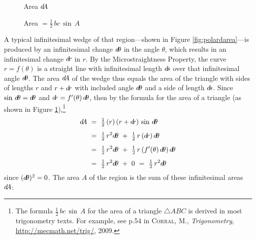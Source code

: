 \begin{figure}[h]
\begin{minipage}[b]{5cm}
\begin{center}
\begin{tikzpicture}[>=latex,every node/.style={font=\small}]
\end{tikzpicture}\vspace{-4mm}
\end{center}
\caption[]{\enskip Area $\dA$}
\label{fig:polardarea}
\end{minipage}
\begin{minipage}[b]{5cm}
\begin{center}
\vspace{-4mm}
\end{center}
\caption[]{\enskip Area $= \tfrac{1}{2}\,bc\,\sin\,A$}
\label{fig:areatriangle}
\end{minipage}
\end{figure}

A typical infinitesimal wedge of that region---shown in Figure
\ref{fig:polardarea}---is produced by an infinitesimal change $\dtheta$ in the
angle $\theta$, which results in an infinitesimal change $\dr$ in $r$. By the
Microstraightness Property, the curve $r=f(\theta)$ is a straight line with
infinitesimal length $\ds$ over that infinitesimal angle $\dtheta$.
The area $\dA$ of the wedge thus equals the area of the triangle with sides
of lengths $r$ and $r+\dr$ with included angle $\dtheta$ and a side of length
$\ds$. Since $\sin\,\dtheta = \dtheta$ and $\dr=f'(\theta)\,\dtheta$, then by
the formula for the area of a triangle (as shown in Figure
\ref{fig:areatriangle}),\footnote{The formula $\tfrac{1}{2}\,bc\,\sin\,A$ for
the area of a triangle $\triangle ABC$ is derived in most trigonometry texts.
For example, see p.54 in \textsc{Corral, M.}, \emph{Trigonometry},
\url{http://mecmath.net/trig/}, 2009.}
\begin{align*}
\dA ~&=~ \tfrac{1}{2}\,(r)\,(r+\dr)\,\sin\,\dtheta\\[4pt]
&=~ \tfrac{1}{2}\,r^2 \dtheta ~+~ \tfrac{1}{2}\,r\,(\dr)\,\dtheta\\[4pt]
&=~ \tfrac{1}{2}\,r^2 \dtheta ~+~ \tfrac{1}{2}\,r\,(f'(\theta)\,\dtheta)\,\dtheta\\[4pt]
&=~ \tfrac{1}{2}\,r^2 \dtheta ~+~ 0 ~=~ \tfrac{1}{2}\,r^2 \dtheta
\end{align*}
since $(\dtheta)^2=0$. The area $A$ of the region is the sum of these
infinitesimal areas $\dA$:

